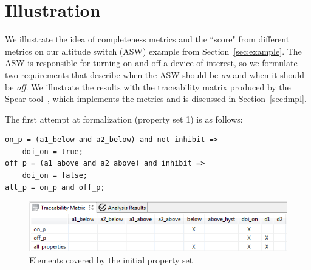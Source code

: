 \section{Illustration}
\label{sec:illust}

\newcommand{\allp}{\texttt{all\_p}}
\newcommand{\onp}{\texttt{on\_p}}
\newcommand{\offp}{\texttt{off\_p}}
\newcommand{\hystp}{\texttt{hyst\_p}}
\newcommand{\aonebelow}{\texttt{a1\_below}}
\newcommand{\atwobelow}{\texttt{a2\_below}}
\newcommand{\aoneabove}{\texttt{a1\_above}}
\newcommand{\atwoabove}{\texttt{a2\_above}}
\newcommand{\doion}{\texttt{doi\_on}}
\newcommand{\done}{\texttt{d1}}
\newcommand{\dtwo}{\texttt{d2}}
\newcommand{\abovehyst}{\texttt{above\_hyst}}
\newcommand{\inhibit}{\texttt{inhibit}}

We illustrate the idea of completeness metrics and the ``score" from different metrics on our altitude switch (ASW) example from Section~\ref{sec:example}.  %
%
The ASW is responsible for turning on and off a device of interest, so we formulate two requirements that describe when the ASW should be {\em on} and when it should be {\em off}.  We illustrate the results with the traceability matrix produced by the Spear tool~\cite{Spear}, which implements the metrics and is discussed in Section~\ref{sec:impl}.

The first attempt at formalization (property set 1) is as follows:

{\smaller
\begin{verbatim}
on_p = (a1_below and a2_below) and not inhibit =>
    doi_on = true;
off_p = (a1_above and a2_above) and inhibit =>
    doi_on = false;
all_p = on_p and off_p;
\end{verbatim}
}

\begin{figure}
  \centering
  \includegraphics[width=\columnwidth]{figs/spear_set1.png}
  \vspace{-0.1in}
  \caption{Elements covered by the initial property set}
  \label{fig:propertyset1}
\end{figure}


